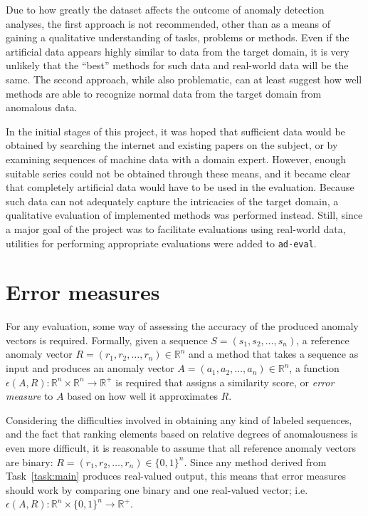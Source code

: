 Due to how greatly the dataset affects the outcome of anomaly detection analyses, the first approach is not recommended, other than as a means of gaining a qualitative understanding of tasks, problems or methods. Even if the artificial data appears highly similar to data from the target domain, it is very unlikely that the ``best'' methods for such data and real-world data will be the same. The second approach, while also problematic, can at least suggest how well methods are able to recognize normal data from the target domain from anomalous data.

In the initial stages of this project, it was hoped that sufficient data would be obtained by searching the internet and existing papers on the subject, or by examining sequences of machine data with a domain expert. However, enough suitable series could not be obtained through these means, and it became clear that completely artificial data would have to be used in the evaluation. Because such data can not adequately capture the intricacies of the target domain, a qualitative evaluation of implemented methods was performed instead. Still, since a major goal of the project was to facilitate evaluations using real-world data, utilities for performing appropriate evaluations were added to \texttt{ad-eval}.
 
\section{Error measures}
\label{sect:evaluation_measures}

For any evaluation, some way of assessing the accuracy of the produced anomaly vectors is required. Formally, given a sequence $S = (s_1, s_2, \dots, s_n)$, a reference anomaly vector $R = (r_1, r_2, \dots, r_n) \in \mathbb{R}^{n}$ and a method that takes a sequence as input and produces an anomaly vector $A = (a_1, a_2, \dots, a_n) \in \mathbb{R}^{n}$, a function $\epsilon(A, R): \mathbb{R}^n \times \mathbb{R}^n \rightarrow \mathbb{R}^+$ is required that assigns a similarity score, or \emph{error measure} to $A$ based on how well it approximates $R$.

Considering the difficulties involved in obtaining any kind of labeled sequences, and the fact that ranking elements based on relative degrees of anomalousness is even more difficult, it is reasonable to assume that all reference anomaly vectors are binary: $R = (r_1, r_2, \dots, r_n) \in {\{0,1\}}^n$. Since any method derived from Task~\ref{task:main} produces real-valued output, this means that error measures should work by comparing one binary and one real-valued vector; i.e.\ $\epsilon{(A, R)}: \mathbb{R}^{n} \times {\{0,1\}}^n \rightarrow \mathbb{R}^+$.

